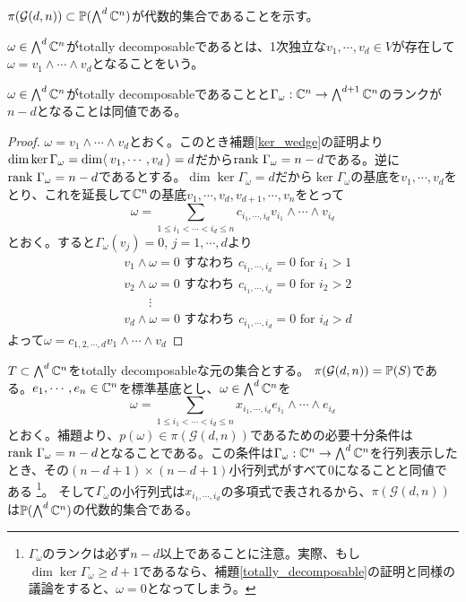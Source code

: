 \documentclass{ltjsreport}
\begin{document}
$\pi(\mathcal{G}(d,n))\subset\mathbb{P}(\bigwedge^d\mathbb{C}^n)$が代数的集合であることを示す。

\begin{defin}
  $\omega\in\bigwedge^d \mathbb{C}^n$がtotally decomposableであるとは、1次独立な$v_1,\cdots,v_d\in V$が存在して$\omega=v_1\wedge\cdots\wedge v_d$となることをいう。
\end{defin}

\begin{lemm}\label{totally_decomposable}
  $\omega\in\bigwedge^d \mathbb{C}^n$がtotally decomposableであることと$\Gamma_\omega:\mathbb{C}^n\rightarrow\bigwedge^{d+1}\mathbb{C}^n$のランクが$n-d$となることは同値である。
\end{lemm}

\begin{proof}
  $\omega=v_1\wedge\cdots\wedge v_d$とおく。このとき補題\ref{ker_wedge}の証明より$\dim\ker\Gamma_\omega=\dim \langle\:v_1,\cdots,v_d\:\rangle=d$だから$\text{rank }\Gamma_\omega=n-d$である。逆に$\text{rank }\Gamma_\omega=n-d$であるとする。$\dim\ker\Gamma_\omega=d$だから$\ker\Gamma_\omega$の基底を$v_1,\cdots,v_d$をとり、これを延長して$\mathbb{C}^n$の基底$v_1,\cdots,v_d,v_{d+1},\cdots,v_n$をとって
  \[
  \omega=\sum_{1\leq i_1<\cdots<i_d\leq n}c_{i_1,\cdots,i_d}v_{i_1}\wedge\cdots\wedge v_{i_d}  
  \]
  とおく。すると$\Gamma_\omega(v_j)=0$, $j=1,\cdots,d$より
  \begin{align*}
    &v_1\wedge\omega=0\text{ すなわち } c_{i_1,\cdots,i_d}=0\text{ for } i_1 > 1\\
    &v_2\wedge\omega=0\text{ すなわち } c_{i_1,\cdots,i_d}=0\text{ for }i_2 > 2\\
    &\qquad\vdots\\
    &v_d\wedge\omega=0\text{ すなわち } c_{i_1,\cdots,i_d}=0\text{ for }i_d > d
  \end{align*}
  よって$\omega=c_{1,2,\cdots,d}v_1\wedge\cdots\wedge v_d$
\end{proof}


$T\subset\bigwedge^d\mathbb{C}^n$をtotally decomposableな元の集合とする。
$\pi(\mathcal{G}(d,n))=\mathbb{P}(S)$である。$e_1,\cdots,e_n\in \mathbb{C}^n$を標準基底とし、$\omega\in\bigwedge^d\mathbb{C}^n$を
\[
\omega=\sum_{1\leq i_1<\cdots<i_d\leq n}x_{i_1,\cdots,i_d}e_{i_1}\wedge\cdots\wedge e_{i_d}  
\]
とおく。補題より、$p(\omega)\in\pi(\mathcal{G}(d,n))$であるための必要十分条件は$\text{rank }\Gamma_\omega=n-d$となることである。この条件は$\Gamma_\omega:\mathbb{C}^n\rightarrow \bigwedge^d\mathbb{C}^n$を行列表示したとき、その$(n-d+1)\times(n-d+1)$小行列式がすべて$0$になることと同値である
\footnote{
  $\Gamma_\omega$のランクは必ず$n-d$以上であることに注意。実際、もし$\dim\ker\Gamma_{\omega}\geq d+1$であるなら、補題\ref{totally_decomposable}の証明と同様の議論をすると、$\omega=0$となってしまう。
}。
そして$\Gamma_\omega$の小行列式は$x_{i_1,\cdots,i_d}$の多項式で表されるから、$\pi(\mathcal{G}(d,n))$は$\mathbb{P}({\bigwedge^d\mathbb{C}^n})$の代数的集合である。
\end{document}
